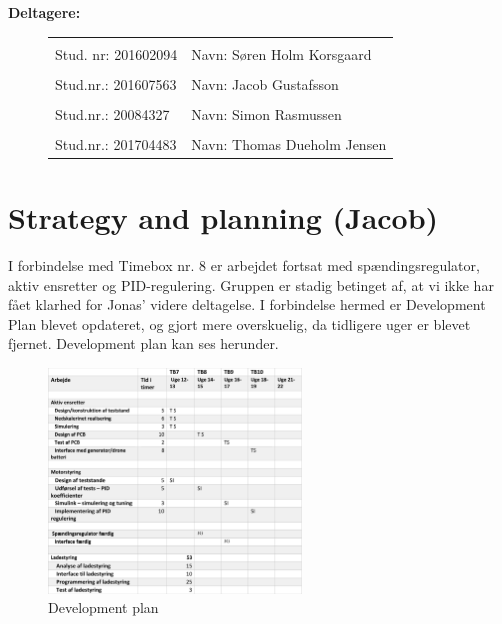 \textbf{Deltagere:}
\begin{figure}[h]
  \centering
  \begin{tabular}{|p{5cm}p{10cm}|}
    \hline
    &\\
    Stud. nr: 201602094 & Navn: Søren Holm Korsgaard \\
    \hline
    &\\
    Stud.nr.: 201607563 & Navn: Jacob Gustafsson \\
    \hline
    &\\
    Stud.nr.: 20084327 & Navn: Simon Rasmussen \\
    \hline
    &\\
    Stud.nr.: 201704483 & Navn: Thomas Dueholm Jensen \\
    \hline
  \end{tabular}

\end{figure}
\vspace{-5mm}
\setcounter{tocdepth}{2}
\tableofcontents
\thispagestyle{empty}
\newpage
\setcounter{page}{1}


\section{Strategy and planning (Jacob)}
\label{sec:strategy-planning}

I forbindelse med Timebox nr. 8 er arbejdet fortsat med spændingsregulator, aktiv ensretter og PID-regulering. Gruppen er stadig betinget af, at vi ikke har fået klarhed for Jonas’ videre deltagelse. I forbindelse hermed er Development Plan blevet opdateret, og gjort mere overskuelig, da tidligere uger er blevet fjernet. 
Development plan kan ses herunder. 

\begin{figure}[h]
  \centering
  \includegraphics[width=0.6\textwidth]{plan.pdf}
  \caption{Development plan}
  \label{fig:plan}
\end{figure}

